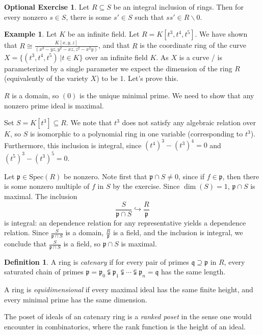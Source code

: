 \documentclass{amsart}[12pt]
\newcommand{\p}{{\mathfrak p}}
\newcommand{\q}{{\mathfrak q}}
\numberwithin{equation}{section}
\theoremstyle{plain} %
\theoremstyle{definition}
\newtheorem{definition}[equation]{Definition}
\newtheorem{ex}[equation]{Example}
\newtheorem{exer}[equation]{Optional Exercise}
\theoremstyle{remark}
\newcommand{\Spec}{\mathrm{Spec}}
\begin{document}
\begin{exer} Let $R\subseteq S$ be an integral inclusion of rings. Then for every nonzero $s\in S$, there is some $s'\in S$ such that $ss'\in R\smallsetminus 0$.
\end{exer}

\begin{ex}
Let $K$ be an infinite field. Let $R=K[t^3,t^4,t^5]$. We have shown that $\displaystyle R\cong \frac{K[x,y,z]}{(x^3-yz,y^2-xz,z^2-x^2y)}$, and that $R$ is the coordinate ring of the curve $X=\{ (t^3,t^4,t^5) \ | t\in K\}$ over an infinite field $K$. As $X$ is a curve / is parameterized by a single parameter we expect the dimension of the ring $R$ (equivalently of the variety $X$) to be $1$. Let's prove this.

$R$ is a domain, so $(0)$ is the unique minimal prime. We need to show that any nonzero prime ideal is maximal.

Set $S=K[t^3]\subseteq R$. We note that $t^3$ does not satisfy any algebraic relation over $K$, so $S$ is isomorphic to a polynomial ring in one variable (corresponding to $t^3$). Furthermore, this inclusion is integral, since $(t^4)^3- (t^3)^4=0$ and $(t^5)^3 - (t^3)^5=0$.

Let $\p\in \Spec(R)$ be nonzero. Note first that $\p \cap S \neq 0$, since if $f\in \p$, then there is some nonzero multiple of $f$ in $S$ by the exercise. Since $\dim(S)=1$, $\p \cap S$ is maximal. The inclusion
\[ \frac{S}{\p \cap S} \hookrightarrow \frac{R}{\p}\] is integral: an dependence relation for any representative yields a dependence relation. Since $\frac{S}{\p \cap S}$ is a domain, $\frac{R}{\p}$ is a field, and the inclusion is integral, we conclude that $\frac{S}{\p \cap S}$ is a field, so $\p \cap S$ is maximal.
\end{ex}


\begin{definition}
 A ring is {\em catenary} if for every pair of primes $\q \supseteq \p$ in $R$, every saturated chain of primes $\p=\p_0 \subsetneqq \p_1  \subsetneqq \cdots \subsetneqq \p_n=\q $
	 has the same length.
	\item A ring is {\em equidimensional} if every maximal ideal has the same finite height, and every minimal prime has the same dimension.
\end{definition}

The poset of ideals of an catenary ring is a {\em ranked poset} in the sense one would encounter in combinatorics, where the rank function is the height of an ideal.
\end{document}
